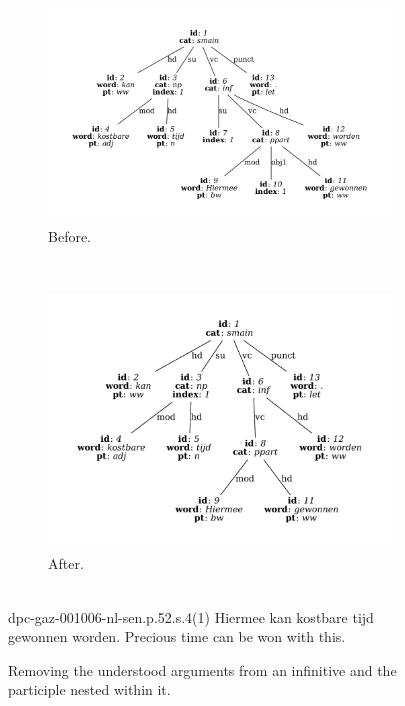 \begin{figure}
	\centering
	\begin{subfigure}[b]{0.75\textwidth}
		\includegraphics[width=1\textwidth, trim={1.5cm 1.5cm 1.5cm 1.5cm}]{./prebuilt/ua_before.pdf}
		\caption{Before.}
	\end{subfigure}\\[\midsep]
	\begin{subfigure}[b]{0.75\textwidth}
			\includegraphics[width=1\textwidth,trim={1.5cm 1.5cm 1.5cm 1.5cm}]{./prebuilt/ua_after.pdf}
		\caption{After.}			
	\end{subfigure}\\[\smallsep]
	\lassycap
		{dpc-gaz-001006-nl-sen.p.52.s.4(1)}
		{Hiermee kan kostbare tijd gewonnen worden.}
		{Precious time can be won with this.}
	\caption{Removing the understood arguments from an infinitive and the participle nested within it.}
	\label{figure:ua}
\end{figure}

